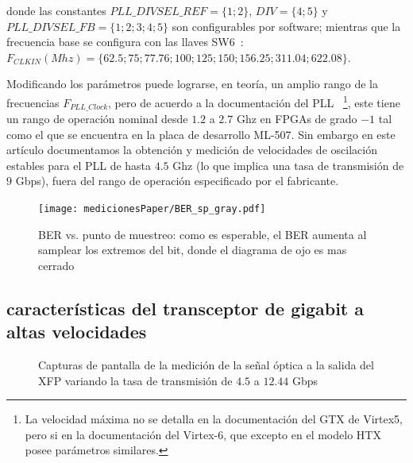 donde las constantes $PLL\_DIVSEL\_REF = \{1;2\}$, $DIV = \{4;5\} $ y
$PLL\_DIVSEL\_FB = \{1;2;3;4;5\}$ son configurables por software;
mientras que la frecuencia base se configura con las llaves
SW6~\cite[Tabla 1-32]{ug347}: $
F_{CLKIN} (Mhz)= \{62.5;75;77.76;100;125;150;156.25;311.04;622.08\}$.


 Modificando los parámetros puede lograrse, en teoría, un amplio rango
de la frecuencias $F_{PLL\_Clock}$, pero de acuerdo a la documentación
del PLL \cite[Pág. 71]{ug366}~\footnote{La velocidad máxima no se
detalla en la documentación del GTX de Virtex5, pero si en la
documentación del Virtex-6, que excepto en el modelo HTX posee parámetros
similares.}, este tiene un rango de operación nominal desde $1.2$ a
$2.7$ Ghz en FPGAs de grado $-1$ tal como el que se encuentra en la
placa de desarrollo ML-507. Sin embargo en este artículo documentamos la
obtención y medición de velocidades de oscilación estables para el PLL
de hasta $4.5$ Ghz (lo que implica una tasa de transmisión de $9$ Gbps),
fuera del rango de operación especificado por el fabricante.

\begin{figure}[t]
  \centering
    \texttt{[image: medicionesPaper/BER\_sp\_gray.pdf]}
\caption {BER vs. punto de muestreo: como es esperable, el BER aumenta al samplear los extremos del bit, donde el diagrama de ojo es mas cerrado}
\label{fig:BERvsSamplingPoint}
\end{figure}

\subsection{características del transceptor de gigabit a altas velocidades}


\begin{figure}[!t]
   \centering
   \qquad
   \qquad
   \qquad
   \qquad
   \qquad
  \caption {Capturas de pantalla de la medición de la señal óptica a la salida del XFP variando la tasa de transmisión de $4.5$ a $12.44$ Gbps}
  \label{fig:ImgTasa}
\end{figure}





